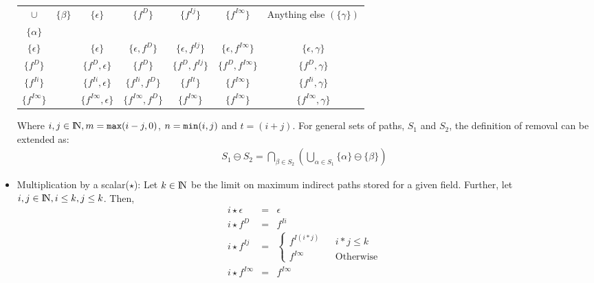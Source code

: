 \documentclass[runningheads,a4paper]{llncs}
\newcommand{\drct}{\ensuremath{D}}
\newcommand{\indrct}{\ensuremath{I}}
\newcommand{\nat}{\ensuremath{\bbbn}}
\newcommand{\remOne}[2]{\ensuremath{#1 \ominus #2}}
\newcommand{\fieldD}[2]{\ensuremath{{#1}_{#2}^\drct}}
\newcommand{\fieldI}[3]{\ensuremath{{#1}_{#2}^{\indrct#3}}}
\begin{document}
\begin{itemize}
{\begin{center}
  \begin{tabular}{|cc|c|c|c|c|c|} \hline
    $\cup$&$\{\beta\} $& $\{\epsilon\}$ & $\{f^{\drct}\}$ & $\{f^{\indrct j}\}$& $\{f^{\indrct\infty}\}$ & Anything else $(\{\gamma\})$ \\
    $\{\alpha\}$ && & & & & \\ \hline \hline
    $\{\epsilon\}$ && $\{\epsilon\}$  & $\{\epsilon, \fieldD{f}{}\}$ & $\{\epsilon, \fieldI{f}{}{j} \}$ & $\{\epsilon, \fieldI{f}{}{\infty}\}$ & $\{\epsilon, \gamma\}$  \\ \hline
    $\{f^{\drct}\}$ && $\{\fieldD{f}{}, \epsilon\}$ & $\{\fieldD{f}{}\}$ & $\{\fieldD{f}{}, \fieldI{f}{}{j}\}$ & $\{\fieldD{f}{}, \fieldI{f}{}{\infty}\}$ & $\{\fieldD{f}{}, \gamma\}$  \\ \hline
    $\{f^{\indrct i}\}$ && $\{\fieldI{f}{}{i}, \epsilon\}$ & $\{\fieldI{f}{}{i}, \fieldD{f}{}\}$ & $\{\fieldI{f}{}{t}\}$& $\{\fieldI{f}{}{\infty}\}$ & $\{\fieldI{f}{}{i}, \gamma\}$  \\ \hline
    $\{f^{\indrct\infty}\}$ && $\{\fieldI{f}{}{\infty}, \epsilon\}$ & $\{\fieldI{f}{}{\infty}, \fieldD{f}{}\}$ & $\{\fieldI{f}{}{\infty}\}$& $\{\fieldI{f}{}{\infty}\}$ & $\{\fieldI{f}{}{\infty}, \gamma\}$  \\ \hline
  \end{tabular} 
\end{center}
Where $i, j  \in \nat, m = {\tt max}(i-j, 0)$, $n = {\tt min}(i, j)$ and $t = (i+j)$.
For general sets of paths, $S_1$ and $S_2$, the definition of
removal can be extended as:
\begin{eqnarray*}
  \remOne{S_1}{S_2}  = \bigcap_{\beta \in
    {S_2}}(\bigcup_{\alpha \in {S_1}}  \remOne{\{\alpha\}}{\{\beta\}}  )
\end{eqnarray*}
}
\item Multiplication by a scalar($\star$): {\red Let $k \in \nat$
  be the limit on maximum indirect paths stored 
  for a given field. Further, let $i, j \in
  \nat, i \leq k, j \leq k$. Then, 
  \begin{eqnarray*}
    i \star {\epsilon} &=&     \epsilon \\
    i \star {f^{\drct}} &=&    f^{\indrct i} \\
    i \star {f^{\indrct j}} &=& \left\{\begin{array}{lcl}
      f^{\indrct (i*j)}&& i*j \leq k \\
      f^{\indrct\infty}&& \mbox{Otherwise} 
    \end{array}\right. \\
    i \star {f^{\indrct\infty}} &=&  {f^{\indrct\infty}}     \\

\end{eqnarray*}}
\end{itemize}
\end{document}
